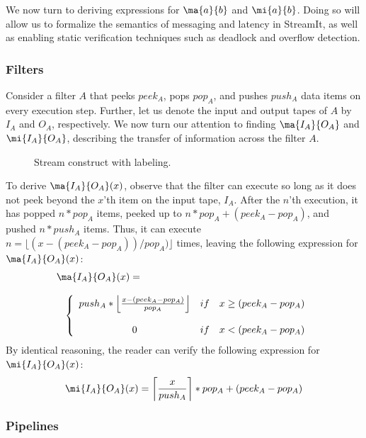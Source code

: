 We now turn to deriving expressions for $\ma{a}{b}$ and $\mi{a}{b}$.
Doing so will allow us to formalize the semantics of messaging and
latency in StreamIt, as well as enabling static verification
techniques such as deadlock and overflow detection.

\subsubsection{Filters}

Consider a filter $A$ that peeks $peek_A$, pops $pop_A$, and pushes
$push_A$ data items on every execution step.  Further, let us denote
the input and output tapes of $A$ by $I_A$ and $O_A$, respectively.
We now turn our attention to finding $\ma{I_A}{O_A}$ and
$\mi{I_A}{O_A}$, describing the transfer of information across the
filter $A$.

\begin{figure}
\centering
{}
\caption{\protect\small Stream construct with labeling.
\protect\label{fig:pipelinelabel}}
\end{figure}

To derive $\ma{I_A}{O_A}(x)$, observe that the filter can execute so
long as it does not peek beyond the $x$'th item on the input tape,
$I_A$.  After the $n$'th execution, it has popped $n*pop_A$ items,
peeked up to $n*pop_A + (peek_A - pop_A)$, and pushed $n*push_A$
items.  Thus, it can execute $n = \lfloor(x - (peek_A - pop_A)) /
pop_A)\rfloor$ times, leaving the following expression for
$\ma{I_A}{O_A}(x)$:
\[
\begin{array}{l}
\ma{I_A}{O_A}(x) = \\ \\
\makebox[.1in]{ } \left\{
\begin{array}{ccl}
push_A*\left\lfloor\frac{x-(peek_A-pop_A)}{pop_A}\right\rfloor & if & x \ge (peek_A-pop_A) \\
 & \\
0 & if & x < (peek_A-pop_A) \\
\end{array} \right.
\end{array}
\]
By identical reasoning, the reader can verify the following
expression for $\mi{I_A}{O_A}(x)$:
\begin{align*}
\mi{I_A}{O_A}(x) = \left\lceil\frac{x}{push_A}\right\rceil*pop_A+(peek_A-pop_A)
\end{align*}
\subsubsection{Pipelines}

